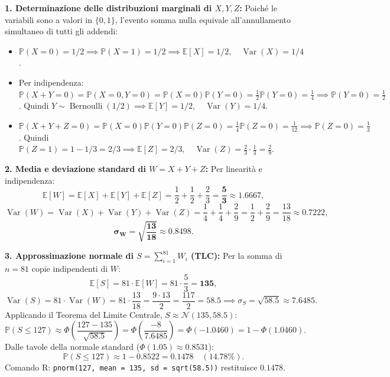 \documentclass[11pt,a4paper]{article}
\newcommand{\EE}{\mathbb{E}}
\newcommand{\Prob}{\mathbb{P}}
\newcommand{\Var}{\operatorname{Var}}
\begin{document}
\begin{soluzionebox}
\textbf{1. Determinazione delle distribuzioni marginali di $X, Y, Z$:}
Poiché le variabili sono a valori in $\{0, 1\}$, l'evento somma nulla equivale all'annullamento simultaneo di tutti gli addendi:
\begin{itemize}
    \item $\Prob(X = 0) = 1/2 \implies \Prob(X = 1) = 1/2 \implies \EE[X] = 1/2, \quad \Var(X) = 1/4$.
    \item Per indipendenza: $\Prob(X+Y = 0) = \Prob(X=0, Y=0) = \Prob(X=0)\Prob(Y=0) = \frac{1}{2}\Prob(Y=0) = \frac{1}{4} \implies \Prob(Y=0) = \frac{1}{2}$.
    Quindi $Y \sim \operatorname{Bernoulli}(1/2) \implies \EE[Y] = 1/2, \quad \Var(Y) = 1/4$.
    \item $\Prob(X+Y+Z = 0) = \Prob(X=0)\Prob(Y=0)\Prob(Z=0) = \frac{1}{4}\Prob(Z=0) = \frac{1}{12} \implies \Prob(Z=0) = \frac{1}{3}$.
    Quindi $\Prob(Z=1) = 1 - 1/3 = 2/3 \implies \EE[Z] = 2/3, \quad \Var(Z) = \frac{2}{3} \cdot \frac{1}{3} = \frac{2}{9}$.
\end{itemize}

\textbf{2. Media e deviazione standard di $W = X+Y+Z$:}
Per linearità e indipendenza:
\[
\EE[W] = \EE[X] + \EE[Y] + \EE[Z] = \frac{1}{2} + \frac{1}{2} + \frac{2}{3} = \bm{\frac{5}{3}} \approx \bm{1.6667},
\]
\[
\Var(W) = \Var(X) + \Var(Y) + \Var(Z) = \frac{1}{4} + \frac{1}{4} + \frac{2}{9} = \frac{1}{2} + \frac{2}{9} = \frac{13}{18} \approx 0.7222,
\]
\[
\bm{\sigma_W = \sqrt{\frac{13}{18}} \approx 0.8498}.
\]

\textbf{3. Approssimazione normale di $S = \sum_{i=1}^{81} W_i$ (TLC):}
Per la somma di $n = 81$ copie indipendenti di $W$:
\[
\EE[S] = 81 \cdot \EE[W] = 81 \cdot \frac{5}{3} = \bm{135},
\]
\[
\Var(S) = 81 \cdot \Var(W) = 81 \cdot \frac{13}{18} = \frac{9 \cdot 13}{2} = \frac{117}{2} = \bm{58.5} \implies \sigma_S = \sqrt{58.5} \approx 7.6485.
\]
Applicando il Teorema del Limite Centrale, $S \approx \mathcal{N}(135, 58.5)$:
\[
\Prob(S \le 127) \approx \Phi\left( \frac{127 - 135}{\sqrt{58.5}} \right) = \Phi\left( \frac{-8}{7.6485} \right) = \Phi(-1.0460) = 1 - \Phi(1.0460).
\]
Dalle tavole della normale standard ($\Phi(1.05) \approx 0.8531$):
\[
\Prob(S \le 127) \approx 1 - 0.8522 = \bm{0.1478} \quad (\bm{14.78\%}).
\]
Comando R: \texttt{pnorm(127, mean = 135, sd = sqrt(58.5))} restituisce $0.1478$.
\end{soluzionebox}
\end{document}
